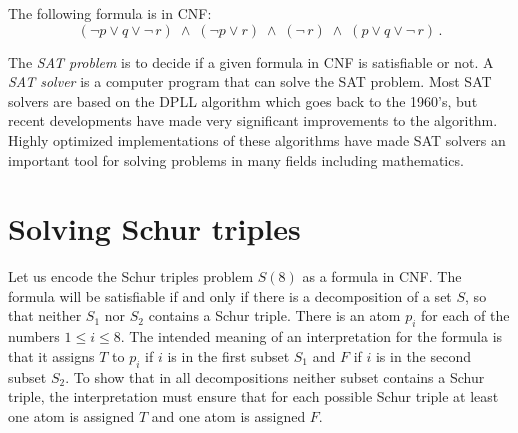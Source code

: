 The following formula is in CNF:
\[
(\neg p \vee q \vee \neg \,r) \;\wedge\; (\neg p \vee r)
\;\wedge\; (\neg \,r)\;\wedge\;(p \vee q \vee \neg \,r)\,.
\]

The \emph{SAT problem} is to decide if a given formula in CNF is satisfiable or not. A \emph{SAT solver} is a computer program that can solve the SAT problem. Most SAT solvers are based on the DPLL algorithm which goes back to the 1960's, but recent developments have made very significant improvements to the algorithm. Highly optimized implementations of these algorithms have made SAT solvers an important tool for solving problems in many fields including mathematics.

\newpage

\section{Solving Schur triples}

Let us encode the Schur triples problem $S(8)$ as a formula in CNF. The formula will be satisfiable if and only if there is a decomposition of a set $S$, so that neither $S_1$ nor $S_2$ contains a Schur triple. There is an atom $p_i$ for each of the numbers $1\leq i \leq 8$. The intended meaning of an interpretation for the formula is that it assigns $T$ to $p_i$ if $i$ is in the first subset $S_1$ and $F$ if $i$ is in the second subset $S_2$. To show that in all decompositions neither subset contains a Schur triple, the interpretation must ensure that for each possible Schur triple at least one atom is assigned $T$ and one atom is assigned $F$. 

